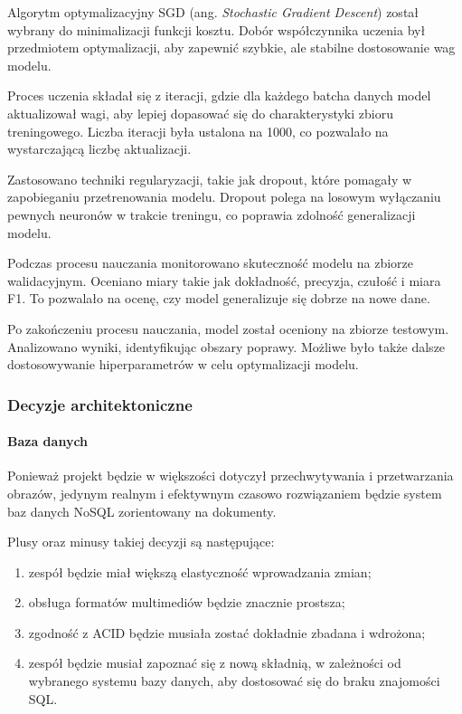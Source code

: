 \documentclass[12pt, a4paper, twoside, openany]{book}
\newcommand{\forceindent}{\leavevmode{\parindent=1.3em\indent}}
\begin{document}
{%
Algorytm optymalizacyjny SGD (ang. \textit{Stochastic Gradient Descent}) został wybrany do minimalizacji funkcji kosztu.
Dobór współczynnika uczenia był przedmiotem optymalizacji, aby zapewnić szybkie, ale stabilne dostosowanie wag modelu.

Proces uczenia składał się z iteracji, gdzie dla każdego batcha danych model aktualizował wagi, aby lepiej dopasować się do charakterystyki zbioru treningowego.
Liczba iteracji była ustalona na 1000, co pozwalało na wystarczającą liczbę aktualizacji.

Zastosowano techniki regularyzacji, takie jak dropout, które pomagały w zapobieganiu przetrenowania modelu.
Dropout polega na losowym wyłączaniu pewnych neuronów w trakcie treningu, co poprawia zdolność generalizacji modelu.

Podczas procesu nauczania monitorowano skuteczność modelu na zbiorze walidacyjnym.
Oceniano miary takie jak dokładność, precyzja, czułość i miara F1.
To pozwalało na ocenę, czy model generalizuje się dobrze na nowe dane.

Po zakończeniu procesu nauczania, model został oceniony na zbiorze testowym. Analizowano wyniki, identyfikując obszary poprawy.
Możliwe było także dalsze dostosowywanie hiperparametrów w celu optymalizacji modelu.

\subsubsection{Decyzje architektoniczne}

\paragraph{Baza danych\\}
\forceindent Ponieważ projekt będzie w większości dotyczył przechwytywania i przetwarzania obrazów, jedynym realnym i efektywnym czasowo rozwiązaniem będzie system baz danych NoSQL zorientowany na dokumenty.

Plusy oraz minusy takiej decyzji są następujące:
\begin{enumerate}[label=--]
    \item zespół będzie miał większą elastyczność wprowadzania zmian;
    \item obsługa formatów multimediów będzie znacznie prostsza;
    \item zgodność z ACID będzie musiała zostać dokładnie zbadana i wdrożona;
    \item zespół będzie musiał zapoznać się z nową składnią, w zależności od wybranego systemu bazy danych, aby dostosować się do braku znajomości SQL.
\end{enumerate}

}
\end{document}
